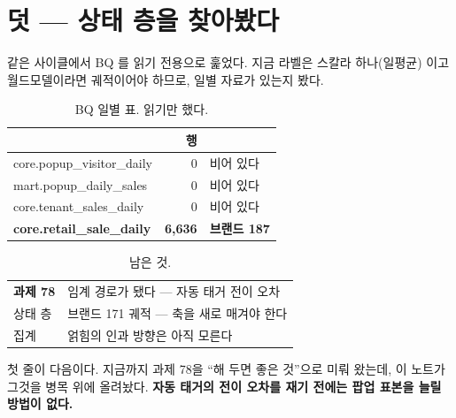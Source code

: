 \documentclass[10pt]{article}
\begin{document}

\section{덧 --- 상태 층을 찾아봤다}

같은 사이클에서 BQ 를 읽기 전용으로 훑었다. 지금 라벨은 스칼라 하나(일평균)
이고 월드모델이라면 궤적이어야 하므로, 일별 자료가 있는지 봤다.

\begin{table}[t]
\centering\tsize
\caption{BQ 일별 표. 읽기만 했다.}
\begin{tabular}{lrl}
\toprule
& 행 & \\
\midrule
core.popup\_visitor\_daily & 0 & 비어 있다 \\
mart.popup\_daily\_sales & 0 & 비어 있다 \\
core.tenant\_sales\_daily & 0 & 비어 있다 \\
\textbf{core.retail\_sale\_daily} & \textbf{6{,}636} & \textbf{브랜드 187} \\
\bottomrule
\end{tabular}
\end{table}


\begin{table}[t]
\centering\tsize
\caption{남은 것.}
\begin{tabular}{ll}
\toprule
\textbf{과제 78} & 임계 경로가 됐다 --- 자동 태거 전이 오차 \\
상태 층 & 브랜드 171 궤적 --- 축을 새로 매겨야 한다 \\
집계 & 얽힘의 인과 방향은 아직 모른다 \\
\bottomrule
\end{tabular}
\end{table}

첫 줄이 다음이다. 지금까지 과제 78을 ``해 두면 좋은 것''으로 미뤄 왔는데,
이 노트가 그것을 병목 위에 올려놨다. \textbf{자동 태거의 전이 오차를 재기
전에는 팝업 표본을 늘릴 방법이 없다.}
\end{document}

